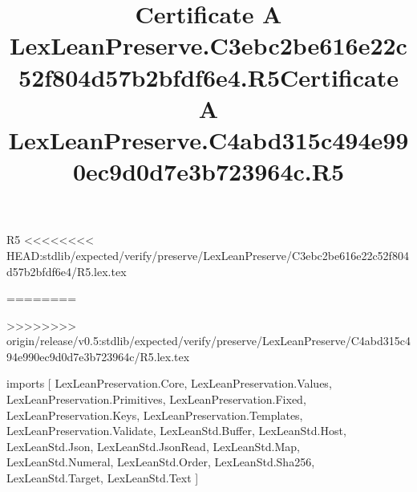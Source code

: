 \begin{lexlean}{R5}
<<<<<<<< HEAD:stdlib/expected/verify/preserve/LexLeanPreserve/C3ebc2be616e22c52f804d57b2bfdf6e4/R5.lex.tex
\title{Certificate A LexLeanPreserve.C3ebc2be616e22c52f804d57b2bfdf6e4.R5}
========
\title{Certificate A LexLeanPreserve.C4abd315c494e990ec9d0d7e3b723964c.R5}
>>>>>>>> origin/release/v0.5:stdlib/expected/verify/preserve/LexLeanPreserve/C4abd315c494e990ec9d0d7e3b723964c/R5.lex.tex
\begin{coremodule}
imports [
  LexLeanPreservation.Core,
  LexLeanPreservation.Values,
  LexLeanPreservation.Primitives,
  LexLeanPreservation.Fixed,
  LexLeanPreservation.Keys,
  LexLeanPreservation.Templates,
  LexLeanPreservation.Validate,
  LexLeanStd.Buffer,
  LexLeanStd.Host,
  LexLeanStd.Json,
  LexLeanStd.JsonRead,
  LexLeanStd.Map,
  LexLeanStd.Numeral,
  LexLeanStd.Order,
  LexLeanStd.Sha256,
  LexLeanStd.Target,
  LexLeanStd.Text
]


\end{coremodule}
\end{lexlean}
